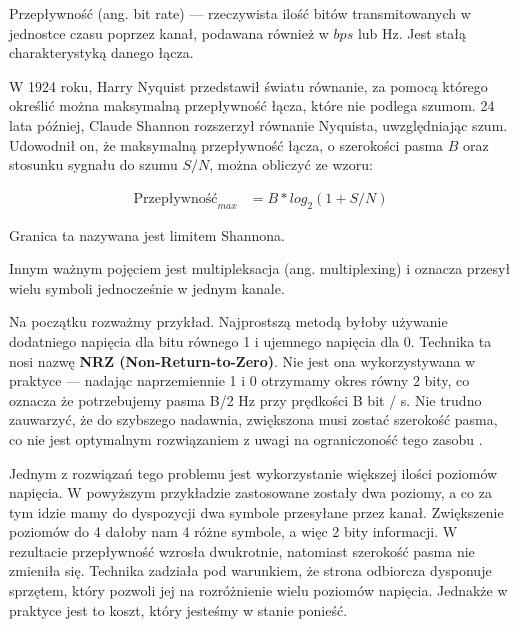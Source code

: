 Przepływność (ang. bit rate) --- rzeczywista ilość bitów transmitowanych w jednostce czasu poprzez kanał, podawana również w $bps$ lub Hz. Jest stałą charakterystyką danego łącza.

W 1924 roku, Harry Nyquist przedstawił światu równanie, za pomocą którego określić można maksymalną przepływność łącza, które nie podlega szumom. 24 lata później, Claude
Shannon rozszerzył równanie Nyquista, uwzględniając szum. Udowodnił on, że maksymalną przepływność łącza, o szerokości pasma $B$ oraz stosunku sygnału do szumu $S/N$, można
obliczyć ze wzoru:

\begin{align*}
    \text{Przepływność}_{max} &= B * log_{2}{(1 + S/N)}
\end{align*}

Granica ta nazywana jest limitem Shannona.

Innym ważnym pojęciem jest multipleksacja (ang. multiplexing) i oznacza przesył wielu symboli jednocześnie w jednym kanale.

Na początku rozważmy przykład. Najprostszą metodą byłoby używanie dodatniego napięcia dla bitu równego 1 i ujemnego napięcia dla 0.
Technika ta nosi nazwę \textbf{NRZ (Non-Return-to-Zero)}. Nie jest ona wykorzystywana w praktyce --- nadając naprzemiennie 1 i 0 otrzymamy okres równy 2 bity, co oznacza że potrzebujemy pasma B/2 Hz przy prędkości B bit / s.
Nie trudno zauwarzyć, że do szybszego nadawnia, zwiększona musi zostać szerokość pasma, co nie jest optymalnym rozwiązaniem z uwagi na ograniczoność tego zasobu \cite{Computer-networks-Tanenbaum}.

Jednym z rozwiązań tego problemu jest wykorzystanie większej ilości poziomów napięcia. W powyższym przykładzie zastosowane zostały dwa poziomy, a co za tym idzie mamy do dyspozycji dwa symbole przesyłane przez kanał.
Zwiększenie poziomów do 4 dałoby nam 4 różne symbole, a więc 2 bity informacji. W rezultacie przepływność wzrosła dwukrotnie, natomiast szerokość pasma nie zmieniła się. Technika zadziała pod warunkiem, że strona odbiorcza dysponuje sprzętem, który pozwoli jej na
rozróżnienie wielu poziomów napięcia. Jednakże w praktyce jest to koszt, który jesteśmy w stanie ponieść.

